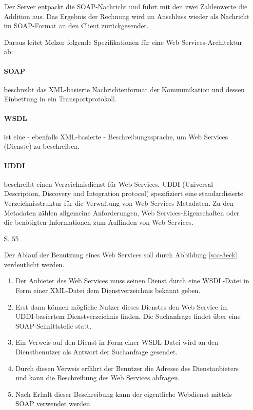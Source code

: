 Der Server entpackt die \gls{SOAP}-Nachricht und führt mit den zwei Zahlenwerte die Addition aus.
Das Ergebnis der Rechnung wird im Anschluss wieder als Nachricht im \gls{SOAP}-Format an den Client zurückgesendet.

Daraus leitet Melzer folgende Spezifikationen für eine Web Services-Architektur ab:
\paragraph{SOAP}
beschreibt das \gls{XML}-basierte Nachrichtenformat der Kommunikation und dessen Einbettung in ein Transportprotokoll.
\paragraph{WSDL}
ist eine - ebenfalls \gls{XML}-basierte - Beschreibungssprache, um Web Services (Dienste) zu beschreiben.
\paragraph{UDDI}
beschreibt einen Verzeichnisdienst für Web Services. \gls{UDDI} (Universal Description, Discovery and Integration protocol) spezifiziert eine standardisierte Verzeichnisstruktur für die Verwaltung von Web Services-Metadaten.
Zu den Metadaten zählen allgemeine Anforderungen, Web Services-Eigenschaften oder die benötigten Informationen zum Auffinden von Web Services.
\begin{flushright}\cite{Melzer08} S. 55\end{flushright}

Der Ablauf der Benutzung eines Web Services soll durch Abbildung \ref{soa-3eck} verdeutlicht werden.

\begin{enumerate}
\item Der Anbieter des Web Services muss seinen Dienst durch eine \gls{WSDL}-Datei in Form einer \gls{XML}-Datei dem Dienstverzeichnis bekannt geben.
\item Erst dann können mögliche Nutzer dieses Dienstes den Web Service im \gls{UDDI}-basiertem Dienstverzeichnis finden. Die Suchanfrage findet über eine \gls{SOAP}-Schnittstelle statt.
\item Ein Verweis auf den Dienst in Form einer \gls{WSDL}-Datei wird an den Dienstbenutzer als Antwort der Suchanfrage gesendet.
\item Durch diesen Verweis erfährt der Benutzer die Adresse des Dienstanbieters und kann die Beschreibung des Web Services abfragen.
\item Nach Erhalt dieser Beschreibung kann der eigentliche Webdienst mittels \gls{SOAP} verwendet werden.
\end{enumerate}

